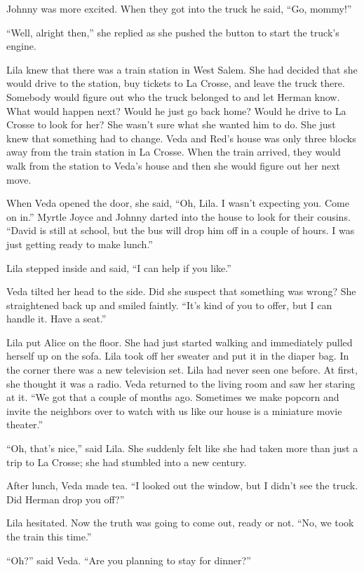 \documentclass[
  american,
  letterpaper,
]{book}
\begin{document}
Johnny was more excited. When they got into the truck he said, ``Go,
mommy!''

``Well, alright then,'' she replied as she pushed the button to start
the truck's engine.

Lila knew that there was a train station in West Salem. She had decided
that she would drive to the station, buy tickets to La Crosse, and leave
the truck there. Somebody would figure out who the truck belonged to and
let Herman know. What would happen next? Would he just go back home?
Would he drive to La Crosse to look for her? She wasn't sure what she
wanted him to do. She just knew that something had to change. Veda and
Red's house was only three blocks away from the train station in La
Crosse. When the train arrived, they would walk from the station to
Veda's house and then she would figure out her next move.

When Veda opened the door, she said, ``Oh, Lila. I wasn't expecting you.
Come on in.'' Myrtle Joyce and Johnny darted into the house to look for
their cousins. ``David is still at school, but the bus will drop him off
in a couple of hours. I was just getting ready to make lunch.''

Lila stepped inside and said, ``I can help if you like.''

Veda tilted her head to the side. Did she suspect that something was
wrong? She straightened back up and smiled faintly. ``It's kind of you
to offer, but I can handle it. Have a seat.''

Lila put Alice on the floor. She had just started walking and
immediately pulled herself up on the sofa. Lila took off her sweater and
put it in the diaper bag. In the corner there was a new television set.
Lila had never seen one before. At first, she thought it was a radio.
Veda returned to the living room and saw her staring at it. ``We got
that a couple of months ago. Sometimes we make popcorn and invite the
neighbors over to watch with us like our house is a miniature movie
theater.''

``Oh, that's nice,'' said Lila. She suddenly felt like she had taken
more than just a trip to La Crosse; she had stumbled into a new century.

After lunch, Veda made tea. ``I looked out the window, but I didn't see
the truck. Did Herman drop you off?''

Lila hesitated. Now the truth was going to come out, ready or not. ``No,
we took the train this time.''

``Oh?'' said Veda. ``Are you planning to stay for dinner?''
\end{document}
